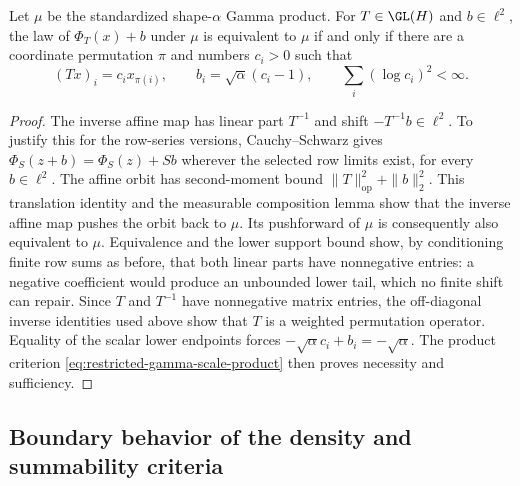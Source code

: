 \begin{corollary}
\label{cor:restricted-gamma-affine}
Let \(\mu\) be the standardized shape-\(\alpha\) Gamma product.
For \(T\in\GL(H)\) and \(b\in\ell^2\), the law of
\(\Phi_T(x)+b\) under \(\mu\) is equivalent to \(\mu\) if and only if
there are a coordinate
permutation \(\pi\) and numbers \(c_i>0\) such that
\[
 (Tx)_i=c_ix_{\pi(i)},\qquad
 b_i=\sqrt\alpha(c_i-1),\qquad
 \sum_i(\log c_i)^2<\infty.
\]
\end{corollary}
\begin{proof}
The inverse affine map has linear part \(T^{-1}\) and shift
\(-T^{-1}b\in\ell^2\).
To justify this for the row-series versions, Cauchy--Schwarz gives
\(\Phi_S(z+b)=\Phi_S(z)+Sb\) wherever the selected row limits exist,
for every \(b\in\ell^2\).
The affine orbit has second-moment bound
\(\|T\|_{\mathrm{op}}^2+\|b\|_2^2\).
This translation identity and the measurable composition lemma show
that the inverse affine map pushes the orbit back to \(\mu\).
Its pushforward of \(\mu\) is consequently also equivalent to \(\mu\).
Equivalence and the lower support bound show, by conditioning
finite row sums as before, that both linear parts have nonnegative
entries: a negative coefficient would produce an unbounded lower
tail, which no finite shift can repair.
Since \(T\) and \(T^{-1}\) have nonnegative matrix entries, the
off-diagonal inverse identities used above show that \(T\) is a
weighted permutation operator.
Equality of the scalar lower endpoints forces
\(-\sqrt\alpha c_i+b_i=-\sqrt\alpha\).
The product criterion \eqref{eq:restricted-gamma-scale-product}
then proves necessity and sufficiency.
\end{proof}

\subsection{Boundary behavior of the density and summability criteria}
\label{sec:restricted-threshold}

